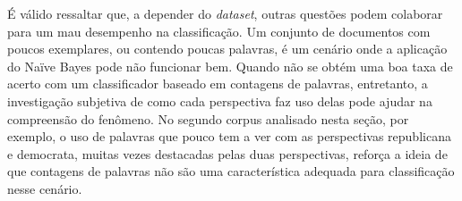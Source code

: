 É válido ressaltar que, a depender do \emph{dataset}, outras questões podem colaborar para um mau desempenho na classificação. Um conjunto de documentos com poucos exemplares, ou contendo poucas palavras, é um cenário onde a aplicação do Naïve Bayes pode não funcionar bem. Quando não se obtém uma boa taxa de acerto com um classificador baseado em contagens de palavras, entretanto, a investigação subjetiva de como cada perspectiva faz uso delas pode ajudar na compreensão do fenômeno. No segundo corpus analisado nesta seção, por exemplo, o uso de palavras que pouco tem a ver com as perspectivas republicana e democrata, muitas vezes destacadas pelas duas perspectivas, reforça a ideia de que contagens de palavras não são uma característica adequada para classificação nesse cenário. %






